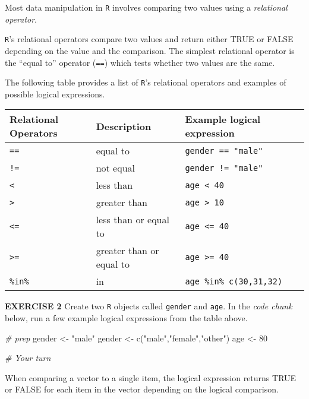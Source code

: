 \documentclass[
]{article}
\newenvironment{Shaded}{\begin{snugshade}}{\end{snugshade}}
\newcommand{\CommentTok}[1]{\textcolor[rgb]{0.56,0.35,0.01}{\textit{#1}}}
\newcommand{\DecValTok}[1]{\textcolor[rgb]{0.00,0.00,0.81}{#1}}
\newcommand{\FunctionTok}[1]{\textcolor[rgb]{0.00,0.00,0.00}{#1}}
\newcommand{\NormalTok}[1]{#1}
\newcommand{\OtherTok}[1]{\textcolor[rgb]{0.56,0.35,0.01}{#1}}
\newcommand{\StringTok}[1]{\textcolor[rgb]{0.31,0.60,0.02}{#1}}
\begin{document}
Most data manipulation in \texttt{R} involves comparing two values using
a \emph{relational operator}.

\texttt{R}'s relational operators compare two values and return either
TRUE or FALSE depending on the value and the comparison. The simplest
relational operator is the ``equal to'' operator (\texttt{==}) which
tests whether two values are the same.

The following table provides a list of \texttt{R}'s relational operators
and examples of possible logical expressions.

\begin{longtable}[]{@{}lll@{}}
\toprule
Relational Operators & Description & Example logical expression \\
\midrule
\endhead
\texttt{==} & equal to & \texttt{gender\ ==\ "male"} \\
\texttt{!=} & not equal & \texttt{gender\ !=\ "male"} \\
\texttt{\textless{}} & less than & \texttt{age\ \textless{}\ 40} \\
\texttt{\textgreater{}} & greater than &
\texttt{age\ \textgreater{}\ 10} \\
\texttt{\textless{}=} & less than or equal to &
\texttt{age\ \textless{}=\ 40} \\
\texttt{\textgreater{}=} & greater than or equal to &
\texttt{age\ \textgreater{}=\ 40} \\
\texttt{\%in\%} & in & \texttt{age\ \%in\%\ c(30,31,32)} \\
\bottomrule
\end{longtable}

\textbf{EXERCISE 2} Create two \texttt{R} objects called \texttt{gender}
and \texttt{age}. In the \emph{code chunk} below, run a few example
logical expressions from the table above.

\begin{Shaded}
\begin{Highlighting}[]
\CommentTok{\# prep}
\NormalTok{gender }\OtherTok{\textless{}{-}} \StringTok{"male"}
\NormalTok{gender }\OtherTok{\textless{}{-}} \FunctionTok{c}\NormalTok{(}\StringTok{"male"}\NormalTok{,}\StringTok{"female"}\NormalTok{,}\StringTok{"other"}\NormalTok{)}
\NormalTok{age    }\OtherTok{\textless{}{-}} \DecValTok{80}

\CommentTok{\# Your turn}
\end{Highlighting}
\end{Shaded}

When comparing a vector to a single item, the logical expression returns
TRUE or FALSE for each item in the vector depending on the logical
comparison.
\end{document}
